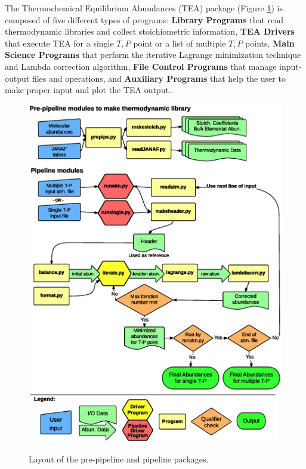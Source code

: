 The Thermochemical Equilibrium Abundances (TEA) package
(Figure \ref{fig:TEAflow}) is composed of five different types of
programs: {\bf Library Programs} that read thermodynamic libraries and
collect stoichiometric information, {\bf TEA Drivers} that execute TEA
for a single $T, P$ point or a list of multiple $T, P$ points, {\bf
Main Science Programs} that perform the iterative Lagrange
minimization technique and Lambda correction algorithm, {\bf File
Control Programs} that manage input-output files and operations, and
{\bf Auxiliary Programs} that help the user to make proper input and
plot the TEA output.




\begin{figure}[!h]
    \centering
    \includegraphics[width=12.25cm, trim=22 100 27 110,
    clip=true]{figs/TEAFlow.ps}
    \includegraphics[width=11cm, trim=22 340 27 320,
    clip=true]{figs/LegFlow.ps}
\caption{Layout of the pre-pipeline and pipeline packages.}
\label{fig:TEAflow}
\end{figure}




